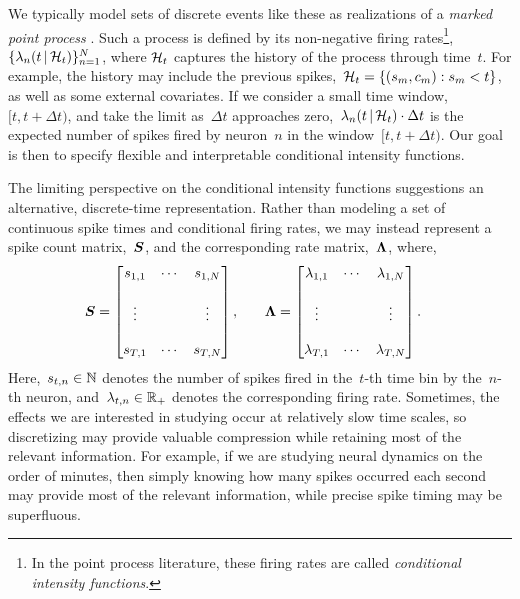 We typically model sets of discrete events like these as realizations
of a \emph{marked point process} \cite{daley2003introduction1}. Such a
process is defined by its non-negative firing rates\footnote{In the
  point process literature, these firing rates are called
  \emph{conditional intensity functions}.},
${\{\lambda_n(t \,|\, \mathcal{H}_t)\}_{n=1}^N}$, where $\mathcal{H}_t$ captures
the history of the process through time~$t$. For example, the history
may include the previous spikes,~${\mathcal{H}_t = \{(s_m, c_m): s_m < t\}}$,
as well as some external covariates.  If we consider a small time
window,~${[t, t+\Delta t)}$, and take the limit as~$\Delta t$
approaches zero,~${\lambda_n(t \,|\, \mathcal{H}_t) \cdot \Delta t}$ is the
expected number of spikes fired by neuron~$n$ in the
window~${[t, t+\Delta t)}$. Our goal is then to specify flexible and
interpretable conditional intensity
functions. 

The limiting perspective on the conditional intensity functions
suggestions an alternative, discrete-time representation.  Rather than
modeling a set of continuous spike times and conditional firing rates,
we may instead represent a spike count matrix,~$\boldsymbol{S}$, and the
corresponding rate matrix,~$\boldsymbol{\Lambda}$, where,
\begin{align*}
  \boldsymbol{S} &= 
        \begin{bmatrix}
          s_{1,1} & \cdots & s_{1,N} \\
          & & \\
          \vdots  &        & \vdots  \\ 
          & & \\
          s_{T,1} & \cdots & s_{T,N}
        \end{bmatrix}, 
  & & &
  \boldsymbol{\Lambda} &= 
        \begin{bmatrix}
          \lambda_{1,1} & \cdots & \lambda_{1,N} \\
          & & \\
          \vdots  &        & \vdots  \\ 
          & & \\
          \lambda_{T,1} & \cdots & \lambda_{T,N}
        \end{bmatrix}.
\end{align*}
Here,~$s_{t,n} \in \mathbb{N}$ denotes the number of spikes fired in
the~$t$-th time bin by the~$n$-th neuron, and~${\lambda_{t,n} \in \mathbb{R}_+}$ denotes 
the corresponding firing rate. Sometimes, the effects we
are interested in studying occur at relatively slow time scales, so
discretizing may provide valuable compression while retaining most of
the relevant information. For example, if we are studying neural
dynamics on the order of minutes, then simply knowing how many spikes
occurred each second may provide most of the relevant information, while
precise spike timing may be superfluous.

